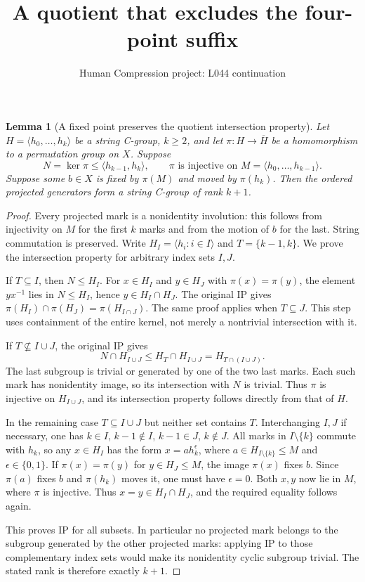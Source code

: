 \documentclass[11pt,a4paper]{article}
\title{A quotient that excludes the four-point suffix}
\author{Human Compression project: L044 continuation}
\date{}
\newtheorem{lemma}{Lemma}
\newcommand{\gen}[1]{\langle#1\rangle}
\begin{document}
\maketitle
\begin{lemma}[A fixed point preserves the quotient intersection property]
\label{quotient}
Let $H=\gen{h_0,\ldots,h_k}$ be a string C-group, $k\ge2$,
and let $\pi:H\longrightarrow\overline H$ be a homomorphism
to a permutation group on $X$. Suppose
\[
 N=\ker\pi\le\gen{h_{k-1},h_k},\qquad
 \pi\text{ is injective on }M=\gen{h_0,\ldots,h_{k-1}}.
\]
Suppose some $b\in X$ is fixed by $\pi(M)$ and moved by
$\pi(h_k)$. Then the ordered projected generators form a
string C-group of rank $k+1$.
\end{lemma}
\begin{proof}
Every projected mark is a nonidentity involution: this follows
from injectivity on $M$ for the first $k$ marks and from the
motion of $b$ for the last. String commutation is preserved.
Write $H_I=\gen{h_i:i\in I}$ and $T=\{k-1,k\}$.
We prove the intersection property for arbitrary index sets $I,J$.

If $T\subseteq I$, then $N\le H_I$. For $x\in H_I$ and
$y\in H_J$ with $\pi(x)=\pi(y)$, the element $yx^{-1}$
lies in $N\le H_I$, hence $y\in H_I\cap H_J$.
The original IP gives
$\pi(H_I)\cap\pi(H_J)=\pi(H_{I\cap J})$.
The same proof applies when $T\subseteq J$. This step uses
containment of the entire kernel, not merely a nontrivial
intersection with it.

If $T\not\subseteq I\cup J$, the original IP gives
\[
 N\cap H_{I\cup J}\le H_T\cap H_{I\cup J}
                  =H_{T\cap(I\cup J)}.
\]
The last subgroup is trivial or generated by one of the two
last marks. Each such mark has nonidentity image, so its
intersection with $N$ is trivial. Thus $\pi$ is injective
on $H_{I\cup J}$, and its intersection property follows
directly from that of $H$.

In the remaining case $T\subseteq I\cup J$ but neither set
contains $T$. Interchanging $I,J$ if necessary, one has
$k\in I$, $k-1\notin I$, $k-1\in J$, $k\notin J$.
All marks in $I\setminus\{k\}$ commute with $h_k$, so any
$x\in H_I$ has the form $x=a h_k^\epsilon$, where
$a\in H_{I\setminus\{k\}}\le M$ and $\epsilon\in\{0,1\}$.
If $\pi(x)=\pi(y)$ for $y\in H_J\le M$, the image $\pi(x)$
fixes $b$. Since $\pi(a)$ fixes $b$ and $\pi(h_k)$ moves it,
one must have $\epsilon=0$. Both $x,y$ now lie in $M$, where
$\pi$ is injective. Thus $x=y\in H_I\cap H_J$, and the
required equality follows again.

This proves IP for all subsets. In particular no projected
mark belongs to the subgroup generated by the other projected
marks: applying IP to those complementary index sets would
make its nonidentity cyclic subgroup trivial. The stated
rank is therefore exactly $k+1$.
\end{proof}
\end{document}
